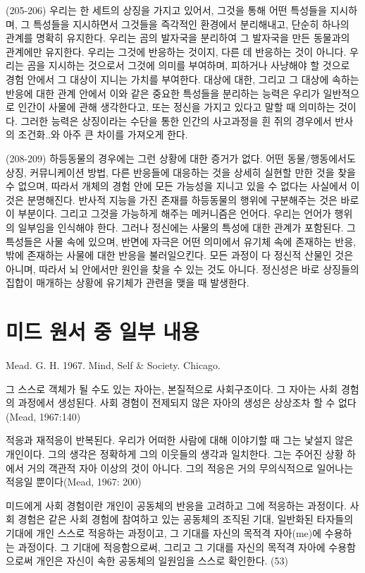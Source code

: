 \documentclass[12pt, a4paper]{article}
\begin{document}
(205-206) 우리는 한 세트의 상징을 가지고 있어서, 그것을 통해 어떤 특성들을 지시하며, 그 특성들을 지시하면서 그것들을 즉각적인 환경에서 분리해내고, 단순히 하나의 관계를 명확히 유지한다. 우리는 곰의 발자국을 분리하여 그 발자국을 만든 동물과의 관계에만 유지한다. 우리는 그것에 반응하는 것이지, 다른 데 반응하는 것이 아니다. 우리는 곰을 지시하는 것으로서 그것에 의미를 부여하며, 피하거나 사냥해야 할 것으로 경험 안에서 그 대상이 지니는 가치를 부여한다. 대상에 대한, 그리고 그 대상에 속하는 반응에 대한 관계 안에서 이와 같은 중요한 특성들을 분리하는 능력은 우리가 일반적으로 인간이 사물에 관해 생각한다고, 또는 정신을 가지고 있다고 말할 때 의미하는 것이다. 그러한 능력은 상징이라는 수단을 통한 인간의 사고과정을 흰 쥐의 경우에서 반사의 조건화..와 아주 큰 차이를 가져오게 한다.

(208-209) 하등동물의 경우에는 그런 상황에 대한 증거가 없다. 어떤 동물/행동에서도 상징, 커뮤니케이션 방법, 다른 반응들에 대응하는 것을 상세히 실현할 만한 것을 찾을 수 없으며, 따라서 개체의 경험 안에 모든 가능성을 지니고 있을 수 없다는 사실에서 이것은 분명해진다. 반사적 지능을 가진 존재를 하등동물의 행위에 구분해주는 것은 바로 이 부분이다. 그리고 그것을 가능하게 해주는 메커니즘은 언어다. 우리는 언어가 행위의 일부임을 인식해야 한다. 그러나 정신에는 사물의 특성에 대한 관계가 포함된다. 그 특성들은 사물 속에 있으며, 반면에 자극은 어떤 의미에서 유기체 속에 존재하는 반응, 밖에 존재하는 사물에 대한 반응을 불러일으킨다. 모든 과정이 다 정신적 산물인 것은 아니며, 따라서 뇌 안에서만 원인을 찾을 수 있는 것도 아니다. 정신성은 바로 상징들의 집합이 매개하는 상황에 유기체가 관련을 맺을 때 발생한다.

\section{미드 원서 중 일부 내용}

Mead. G. H. 1967. Mind, Self & Society. Chicago.

그 스스로 객체가 될 수도 있는 자아는, 본질적으로 사회구조이다. 그 자아는 사회 경험의 과정에서 생성된다. 사회 경험이 전제되지 않은 자아의 생성은 상상조차 할 수 없다(Mead, 1967:140)

적응과 재적응이 반복된다. 우리가 어떠한 사람에 대해 이야기할 때 그는 낯설지 않은 개인이다. 그의 생각은 정확하게 그의 이웃들의 생각과 일치한다. 그는 주어진 상황 하에서 거의 객관적 자아 이상의 것이 아니다. 그의 적응은 거의 무의식적으로 일어나는 적응일 뿐이다(Mead, 1967: 200)

미드에게 사회 경험이란 개인이 공동체의 반응을 고려하고 그에 적응하는 과정이다. 사회 경험은 같은 사회 경험에 참여하고 있는 공동체의 조직된 기대, 일반화된 타자들의 기대에 개인 스스로 적응하는 과정이고, 그 기대를 자신의 목적격 자아(me)에 수용하는 과정이다. 그 기대에 적응함으로써, 그리고 그 기대를 자신의 목적격 자아에 수용함으로써 개인은 자신이 속한 공동체의 일원임을 스스로 확인한다. (53)
\end{document}
